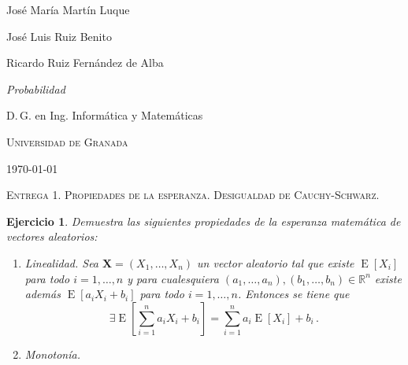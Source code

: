 \documentclass[
  a4paper,
  spanish,
  12pt,
]{scrartcl}
\theoremstyle{ejercicio-style}
\newtheorem{ejer}{Ejercicio}
\theoremstyle{remark-style}
\begin{document}
\begin{flushright}
  José María Martín Luque
  
  José Luis Ruiz Benito

  Ricardo Ruiz Fernández de Alba
  \vspace{.5em}

  \textit{Probabilidad}

  D.\,G. en Ing. Informática y Matemáticas

  \textsc{Universidad de Granada}\vspace{.5em}

  \today\vspace{.5em}
\end{flushright}

\begin{flushleft}
  \scshape\Large Entrega 1. Propiedades de la esperanza. Desigualdad de Cauchy-Schwarz.
\end{flushleft}

\begin{ejer}
  Demuestra las siguientes propiedades de la esperanza matemática de vectores aleatorios: \begin{enumerate}
    \item Linealidad. Sea \(\symbf{X} = (X_1, \dots, X_n)\) un vector aleatorio tal que existe \(\operatorname{E}[X_i]\) para todo \(i = 1, \dots, n\) y para cualesquiera \((a_1, \dots, a_n), (b_1, \dots, b_n) \in \mathbb R^n\) existe además \(\operatorname{E}[a_iX_i + b_i]\) para todo \(i = 1, \dots, n\). Entonces se tiene que \[
      \exists \operatorname{E}\left[\sum_{i=1}^n a_iX_i + b_i\right] =  \sum_{i=1}^{n}a_i \operatorname{E}[X_i] + b_i\,.
    \]
    \item Monotonía.
  \end{enumerate}
\end{ejer}
\end{document}
